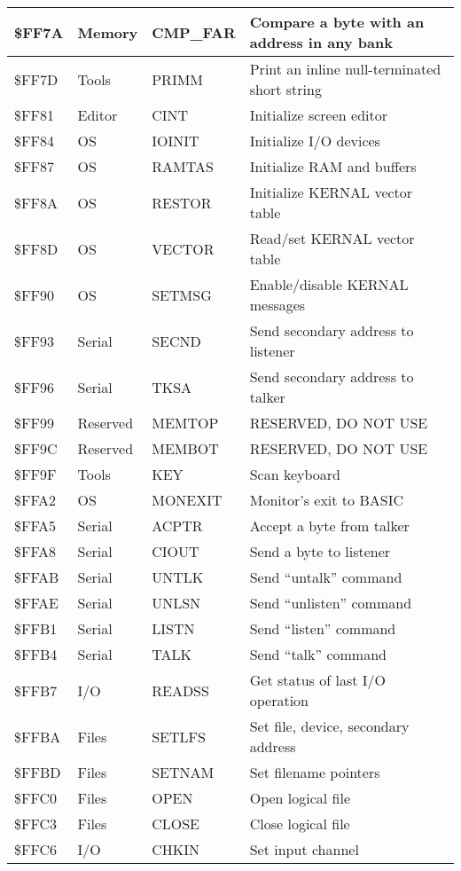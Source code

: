 \begin{longtable}{|L{2cm}|p{2cm}|p{2cm}|L{6cm}|}
\hline
\$FF7A & Memory & CMP\_FAR & Compare a byte with an address in any bank \\
\hline
\$FF7D & Tools & PRIMM & Print an inline null-terminated short string \\
\hline
\$FF81 & Editor & CINT & Initialize screen editor \\
\hline
\$FF84 & OS & IOINIT & Initialize I/O devices \\
\hline
\$FF87 & OS & RAMTAS & Initialize RAM and buffers \\
\hline
\$FF8A & OS & RESTOR & Initialize KERNAL vector table \\
\hline
\$FF8D & OS & VECTOR & Read/set KERNAL vector table \\
\hline
\$FF90 & OS & SETMSG & Enable/disable KERNAL messages \\
\hline
\$FF93 & Serial & SECND & Send secondary address to listener \\
\hline
\$FF96 & Serial & TKSA & Send secondary address to talker \\
\hline
\$FF99 & Reserved & MEMTOP & RESERVED, DO NOT USE \\
\hline
\$FF9C & Reserved & MEMBOT & RESERVED, DO NOT USE \\
\hline
\$FF9F & Tools & KEY & Scan keyboard \\
\hline
\$FFA2 & OS & MONEXIT & Monitor's exit to BASIC \\
\hline
\$FFA5 & Serial & ACPTR & Accept a byte from talker \\
\hline
\$FFA8 & Serial & CIOUT & Send a byte to listener \\
\hline
\$FFAB & Serial & UNTLK & Send ``untalk'' command \\
\hline
\$FFAE & Serial & UNLSN & Send ``unlisten'' command \\
\hline
\$FFB1 & Serial & LISTN & Send ``listen'' command \\
\hline
\$FFB4 & Serial & TALK & Send ``talk'' command \\
\hline
\$FFB7 & I/O & READSS & Get status of last I/O operation \\
\hline
\$FFBA & Files & SETLFS & Set file, device, secondary address \\
\hline
\$FFBD & Files & SETNAM & Set filename pointers \\
\hline
\$FFC0 & Files & OPEN & Open logical file \\
\hline
\$FFC3 & Files & CLOSE & Close logical file \\
\hline
\$FFC6 & I/O & CHKIN & Set input channel \\

\end{longtable}
